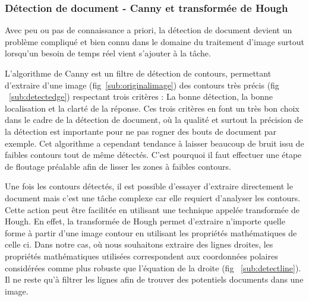 \subsubsection{Détection de document - Canny et transformée de Hough}
\label{subsubsec:cannyhough} 
Avec peu ou pas de connaissance a priori, la détection de document devient un problème compliqué et bien connu dans le domaine du traitement d'image surtout lorsqu'un besoin de temps réel vient s'ajouter à la tâche.

L'algorithme de Canny\cite{Canny86acomputational} est un filtre de détection de contours, permettant d'extraire d'une image (fig~\ref{sub:originalimage}) des contours très précis (fig ~\ref{sub:detectedge}) respectant trois critères : La bonne détection, la bonne localisation et la clarté de la réponse. Ces trois critères en font un très bon choix dans le cadre de la détection de document, où la qualité et surtout la précision de la détection est importante pour ne pas rogner des bouts de document par exemple. Cet algorithme a cependant tendance à laisser beaucoup de bruit issu de faibles contours tout de même détectés. C'est pourquoi il faut effectuer une étape de floutage préalable afin de lisser les zones à faibles contours.

Une fois les contours détectés, il est possible d'essayer d'extraire directement le document mais c'est une tâche complexe car elle requiert d'analyser les contours. Cette action peut être facilitée en utilisant une technique appelée transformée de Hough\cite{hough}. En effet, la transformée de Hough permet d'extraire n'importe quelle forme à partir d'une image contour en utilisant les propriétés mathématiques de celle ci. Dans notre cas, où nous souhaitons extraire des lignes droites, les propriétés mathématiques utilisées correspondent aux coordonnées polaires considérées comme plus robuste que l’équation de la droite (fig ~\ref{sub:detectline}). Il ne reste qu'à filtrer les lignes afin de trouver des potentiels documents dans une image.

